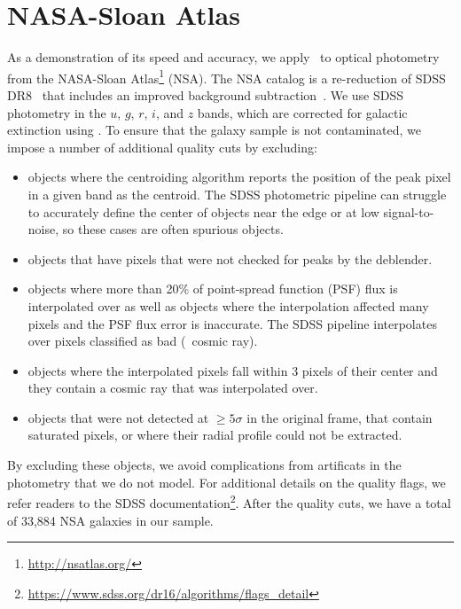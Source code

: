 \section{NASA-Sloan Atlas} \label{sec:obs}
As a demonstration of its speed and accuracy, we apply \sedflow~to optical
photometry from the NASA-Sloan Atlas\footnote{\url{http://nsatlas.org/}} (NSA).
The NSA catalog is a re-reduction of SDSS DR8~\citep{aihara2011} that includes
an improved background subtraction~\citep{blanton2011}.
We use SDSS photometry in the $u$, $g$, $r$, $i$, and $z$ bands, which are
corrected for galactic extinction using \cite{schlegel1998}.
To ensure that the galaxy sample is not contaminated, we impose a number of
additional quality cuts by excluding:
\begin{itemize}
    \item objects where the centroiding algorithm reports the
    position of the peak pixel in a given band as the centroid. 
    The SDSS photometric pipeline can struggle to accurately define the center
    of objects near the edge or at low signal-to-noise, so these cases are
    often spurious objects. 
    \item objects that have pixels that were not checked for peaks by the
    deblender. 
    \item objects where more than 20\% of point-spread function (PSF) flux is
    interpolated over as well as objects where the interpolation affected many
    pixels and the PSF flux error is inaccurate. 
    The SDSS pipeline interpolates over pixels classified as bad (\eg~cosmic
    ray).
    \item objects where the interpolated pixels fall within 3 pixels of their
    center and they contain a cosmic ray that was interpolated over.
    \item objects that were not detected at $\ge5\sigma$ in the original frame,
    that contain saturated pixels, or where their radial profile could not be
    extracted.
\end{itemize}
By excluding these objects, we avoid complications from artificats in the
photometry that we do not model. 
For additional details on the quality flags, we refer readers to the SDSS
documentation\footnote{\url{https://www.sdss.org/dr16/algorithms/flags_detail}}.
After the quality cuts, we have a total of 33,884 NSA galaxies in our sample.

